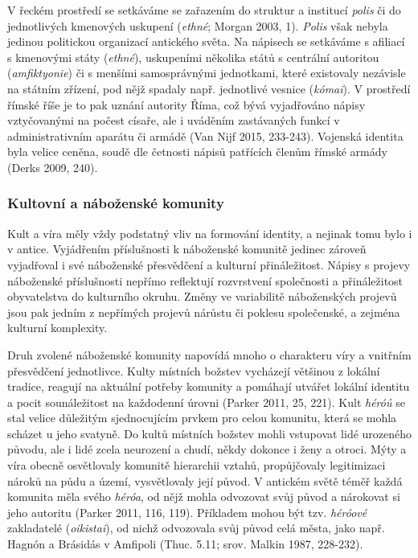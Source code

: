 V řeckém prostředí se setkáváme se zařazením do struktur a institucí {\em polis} či do jednotlivých kmenových uskupení ({\em ethné}; Morgan 2003, 1). {\em Polis} však nebyla jedinou politickou organizací antického světa. Na nápisech se setkáváme s afiliací s kmenovými státy ({\em ethné}), uskupeními několika států s centrální autoritou ({\em amfiktyonie}) či s menšími samosprávnými jednotkami, které existovaly nezávisle na státním zřízení, pod nějž spadaly např. jednotlivé vesnice ({\em kómai}). V prostředí římské říše je to pak uznání autority Říma, což bývá vyjadřováno nápisy vztyčovanými na počest císaře, ale i uváděním zastávaných funkcí v administrativním aparátu či armádě (Van Nijf 2015, 233-243). Vojenská identita byla velice ceněna, soudě dle četnosti nápisů patřících členům římské armády (Derks 2009, 240).

\subsubsection[kultovní-a-náboženské-komunity]{Kultovní a náboženské komunity}

Kult a víra měly vždy podstatný vliv na formování identity, a nejinak tomu bylo i v antice. Vyjádřením příslušnosti k náboženské komunitě jedinec zároveň vyjadřoval i své náboženské přesvědčení a kulturní přináležitost. Nápisy s projevy náboženské příslušnosti nepřímo reflektují rozvrstvení společnosti a přináležitost obyvatelstva do kulturního okruhu. Změny ve variabilitě náboženských projevů jsou pak jedním z nepřímých projevů nárůstu či poklesu společenské, a zejména kulturní komplexity.

Druh zvolené náboženské komunity napovídá mnoho o charakteru víry a vnitřním přesvědčení jednotlivce. Kulty místních božstev vycházejí většinou z lokální tradice, reagují na aktuální potřeby komunity a pomáhají utvářet lokální identitu a pocit sounáležitost na každodenní úrovni (Parker 2011, 25, 221). Kult {\em héróů} se stal velice důležitým sjednocujícím prvkem pro celou komunitu, která se mohla scházet u jeho svatyně. Do kultů místních božstev mohli vstupovat lidé urozeného původu, ale i lidé zcela neurození a chudí, někdy dokonce i ženy a otroci. Mýty a víra obecně osvětlovaly komunitě hierarchii vztahů, propůjčovaly legitimizaci nároků na půdu a území, vysvětlovaly její původ. V antickém světě téměř každá komunita měla svého {\em héróa}, od nějž mohla odvozovat svůj původ a nárokovat si jeho autoritu (Parker 2011, 116, 119). Příkladem mohou být tzv. {\em héróové} zakladatelé ({\em oikistai}), od nichž odvozovala svůj původ celá města, jako např. Hagnón a Brásidás v Amfipoli (Thuc. 5.11; srov. Malkin 1987, 228-232).

